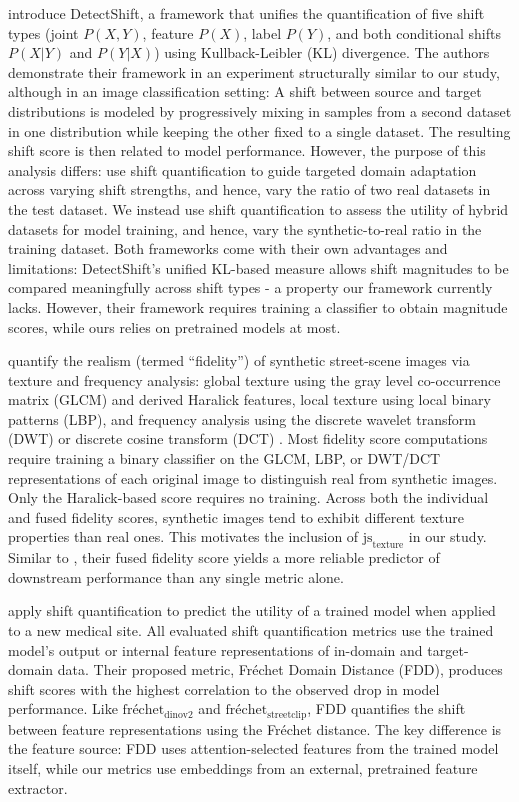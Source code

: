 \documentclass[conference]{IEEEtran}
\begin{document}
\cite{DetectShift} introduce DetectShift, a framework that unifies the quantification of five shift types (joint $P(X,Y)$, feature $P(X)$, label $P(Y)$, and both conditional shifts $P(X|Y)$ and $P(Y|X)$) using Kullback-Leibler (KL) divergence. The authors demonstrate their framework in an experiment structurally similar to our study, although in an image classification setting: A shift between source and target distributions is modeled by progressively mixing in samples from a second dataset in one distribution while keeping the other fixed to a single dataset. The resulting shift score is then related to model performance. 
However, the purpose of this analysis differs: \cite{DetectShift} use shift quantification to guide targeted domain adaptation across varying shift strengths, and hence, vary the ratio of two real datasets in the test dataset. We instead use shift quantification to assess the utility of hybrid datasets for model training, and hence, vary the synthetic-to-real ratio in the training dataset.
Both frameworks come with their own advantages and limitations: DetectShift’s unified KL-based measure allows shift magnitudes to be compared meaningfully across shift types - a property our framework currently lacks. However, their framework requires training a classifier to obtain magnitude scores, while ours relies on pretrained models at most. 

\cite{duminil2024, duminil2025} quantify the realism (termed “fidelity”) of synthetic street-scene images via texture and frequency analysis: global texture using the gray level co-occurrence matrix (GLCM) and derived Haralick features, local texture using local binary patterns (LBP), and frequency analysis using the discrete wavelet transform (DWT) \cite{duminil2024} or discrete cosine transform (DCT) \cite{duminil2025}. Most fidelity score computations require training a binary classifier on the GLCM, LBP, or DWT/DCT representations of each original image to distinguish real from synthetic images. Only the Haralick-based score requires no training. Across both the individual \cite{duminil2024} and fused \cite{duminil2025} fidelity scores, synthetic images tend to exhibit different texture properties than real ones. This motivates the inclusion of $\text{js}_{\text{texture}}$ in our study. Similar to \cite{bartkowiak2026}, their fused fidelity score yields a more reliable predictor of downstream performance than any single metric alone.

\cite{shiftForModelUtility} apply shift quantification to predict the utility of a trained model when applied to a new medical site. All evaluated shift quantification metrics use the trained model's output or internal feature representations of in-domain and target-domain data. Their proposed metric, Fréchet Domain Distance (FDD), produces shift scores with the highest correlation to the observed drop in model performance. Like $\text{fréchet}_{\text{dinov2}}$ and $\text{fréchet}_{\text{streetclip}}$, FDD quantifies the shift between feature representations using the Fréchet distance. The key difference is the feature source: FDD uses attention-selected features from the trained model itself, while our metrics use embeddings from an external, pretrained feature extractor.
\end{document}
